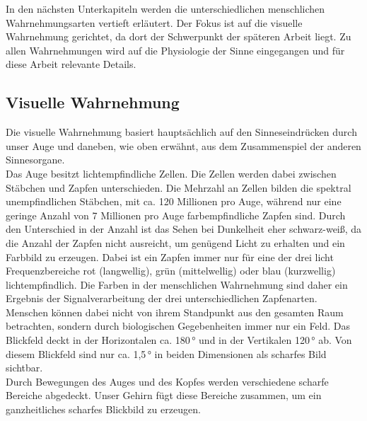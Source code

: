 In den nächsten Unterkapiteln werden die unterschiedlichen menschlichen Wahrnehmungsarten vertieft erläutert. Der Fokus ist auf die visuelle Wahrnehmung gerichtet, da dort der Schwerpunkt der späteren Arbeit liegt. Zu allen Wahrnehmungen wird auf die Physiologie der Sinne eingegangen und für diese Arbeit relevante Details.
\subsection{Visuelle Wahrnehmung}
Die visuelle Wahrnehmung basiert hauptsächlich auf den Sinneseindrücken durch unser Auge und daneben, wie oben erwähnt, aus dem Zusammenspiel der anderen Sinnesorgane. \\
Das Auge besitzt lichtempfindliche Zellen. Die Zellen werden dabei zwischen Stäbchen und Zapfen unterschieden. Die Mehrzahl an Zellen bilden die spektral unempfindlichen Stäbchen, mit ca. 120 Millionen pro Auge, während nur eine geringe Anzahl von 7 Millionen pro Auge farbempfindliche Zapfen sind. Durch den Unterschied in der Anzahl ist das Sehen bei Dunkelheit eher schwarz-weiß, da die Anzahl der Zapfen nicht ausreicht, um genügend Licht zu erhalten und ein Farbbild zu erzeugen. Dabei ist ein Zapfen immer nur für eine der drei licht Frequenzbereiche rot (langwellig), grün (mittelwellig) oder blau (kurzwellig) lichtempfindlich. Die Farben in der menschlichen Wahrnehmung sind daher ein Ergebnis der Signalverarbeitung der drei unterschiedlichen Zapfenarten. \cite[Vgl. Seite 14]{Buhler.2017}\\
Menschen können dabei nicht von ihrem Standpunkt aus den gesamten Raum betrachten, sondern durch biologischen Gegebenheiten immer nur ein Feld. Das Blickfeld deckt in der Horizontalen ca. 180\,° und in der Vertikalen 120\,° ab. Von diesem Blickfeld sind nur ca. 1,5\,° in beiden Dimensionen als scharfes Bild sichtbar. \\
Durch Bewegungen des Auges und des Kopfes werden verschiedene scharfe Bereiche abgedeckt. Unser Gehirn fügt diese Bereiche zusammen, um ein ganzheitliches scharfes Blickbild zu erzeugen. \cite[Vgl. Seite 14]{Buhler.2017}
